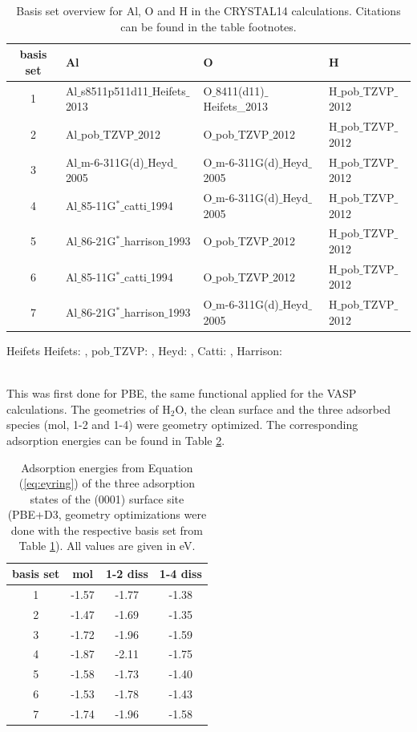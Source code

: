 \documentclass[11pt,DIV=13,BCOR=5mm,a4paper,headinclude]{scrbook}
\begin{document}
\begin{table}[!h]
  \centering
   \caption{Basis set overview for Al, O and H in the CRYSTAL14 calculations. Citations can be found in the table footnotes.}
  \begin{tabular}{c|lll}
  \toprule
  basis set & Al & O & H \\\midrule
   1&Al$\_$s8511p511d11$\_$Heifets$\_$2013 & O$\_$8411(d11)$\_$Heifets\_2013&H$\_$pob$\_$TZVP$\_$2012 \\
   2&Al$\_$pob$\_$TZVP$\_$2012 &O$\_$pob$\_$TZVP$\_$2012 & H$\_$pob$\_$TZVP$\_$2012\\
   3&Al$\_$m-6-311G(d)$\_$Heyd$\_$2005 &O$\_$m-6-311G(d)$\_$Heyd$\_$2005 & H$\_$pob$\_$TZVP$\_$2012\\
   4&Al$\_$85-11G$^\ast\_$catti$\_$1994 &O$\_$m-6-311G(d)$\_$Heyd$\_$2005 & H$\_$pob$\_$TZVP$\_$2012\\
   5&Al$\_$86-21G$^\ast\_$harrison$\_$1993 &O$\_$pob$\_$TZVP$\_$2012 & H$\_$pob$\_$TZVP$\_$2012\\
   6&Al$\_$85-11G$^\ast\_$catti$\_$1994 &O$\_$pob$\_$TZVP$\_$2012 & H$\_$pob$\_$TZVP$\_$2012\\
   7&Al$\_$86-21G$^\ast\_$harrison$\_$1993 &O$\_$m-6-311G(d)$\_$Heyd$\_$2005 & H$\_$pob$\_$TZVP$\_$2012\\\bottomrule
  \end{tabular}
  \begin{tablenotes}
 \footnotesize
\item[Heifets] Heifets: \cite{heifets}, pob$\_$TZVP: \cite{pobTZVP}, Heyd: \cite{heyd1,heyd2}, Catti: \cite{catti}, Harrison: \cite{harrison1,harrison2}
\end{tablenotes}
  \label{tab:basissets}
\end{table}
 \\
This was first done for PBE, the same functional applied for the VASP calculations.
The geometries of H$_2$O, the clean surface and the three adsorbed species (mol, 1-2 and 1-4) were geometry optimized.
The corresponding adsorption energies can be found in Table \ref{tab:basisset-results-PBE+D3}.
\begin{table}[!h]
  \centering
   \caption{Adsorption energies from Equation (\ref{eq:eyring}) of the three adsorption states of the (0001) surface site (PBE+D3, geometry optimizations were done with the respective basis set from Table \ref{tab:basissets}).
All values are given in eV.}
  \begin{tabular}{c|ccc}
  \toprule
  basis set & mol & 1-2 diss & 1-4 diss \\\midrule
  1 &-1.57 &-1.77 &-1.38 \\
  2 &-1.47 &-1.69 &-1.35 \\
  3 &-1.72 &-1.96 &-1.59 \\
  4 &-1.87 &-2.11 &-1.75 \\
  5 &-1.58 &-1.73 &-1.40 \\
  6 &-1.53 &-1.78 &-1.43 \\
  7 &-1.74 &-1.96 &-1.58 \\\bottomrule  
  \end{tabular}
  \label{tab:basisset-results-PBE+D3}
\end{table}
\end{document}
